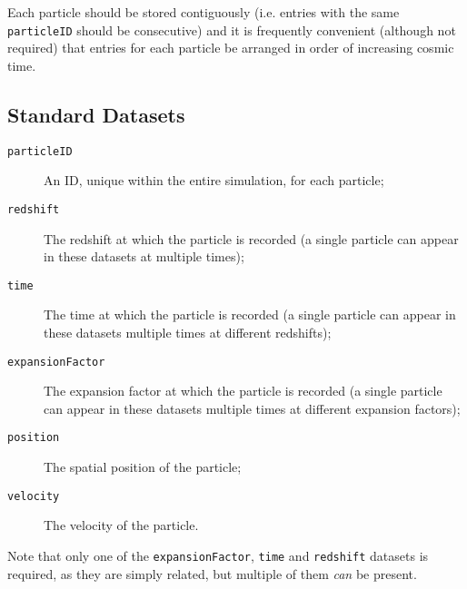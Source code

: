 Each particle should be stored contiguously (i.e. entries with the same {\tt particleID} should be consecutive) and it is frequently convenient (although not required) that entries for each particle be arranged in order of increasing cosmic time.

\subsection{Standard Datasets}

\begin{description}
 \item [{\tt particleID}] An ID, unique within the entire simulation, for each particle;
 \item [{\tt redshift}] The redshift at which the particle is recorded (a single particle can appear in these datasets at multiple times);
 \item [{\tt time}] The time at which the particle is recorded (a single particle can appear in these datasets multiple times at different redshifts);
 \item [{\tt expansionFactor}] The expansion factor at which the particle is recorded (a single particle can appear in these datasets multiple times at different expansion factors);
 \item [{\tt position}] The spatial position of the particle;
 \item [{\tt velocity}] The velocity of the particle.
\end{description}

Note that only one of the {\tt expansionFactor}, {\tt time} and {\tt redshift} datasets is required, as they are simply related, but multiple of them \emph{can} be present.
